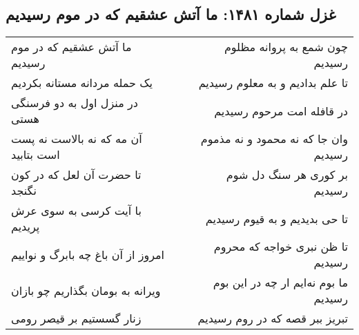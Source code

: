 \begin{center}
\section*{غزل شماره ۱۴۸۱: ما آتش عشقیم که در موم رسیدیم}
\label{sec:1481}
\begin{longtable}{l p{0.5cm} r}
ما آتش عشقیم که در موم رسیدیم
&&
چون شمع به پروانه مظلوم رسیدیم
\\
یک حمله مردانه مستانه بکردیم
&&
تا علم بدادیم و به معلوم رسیدیم
\\
در منزل اول به دو فرسنگی هستی
&&
در قافله امت مرحوم رسیدیم
\\
آن مه که نه بالاست نه پست است بتابید
&&
وان جا که نه محمود و نه مذموم رسیدیم
\\
تا حضرت آن لعل که در کون نگنجد
&&
بر کوری هر سنگ دل شوم رسیدیم
\\
با آیت کرسی به سوی عرش پریدیم
&&
تا حی بدیدیم و به قیوم رسیدیم
\\
امروز از آن باغ چه بابرگ و نواییم
&&
تا ظن نبری خواجه که محروم رسیدیم
\\
ویرانه به بومان بگذاریم چو بازان
&&
ما بوم نه‌ایم ار چه در این بوم رسیدیم
\\
زنار گسستیم بر قیصر رومی
&&
تبریز ببر قصه که در روم رسیدیم
\\
\end{longtable}
\end{center}

